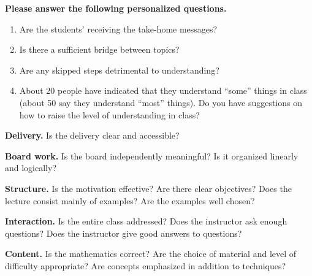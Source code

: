 \documentclass[10pt]{article}
\begin{document}
{\bf Please answer the following personalized questions.}
\begin{enumerate}
\item Are the students' receiving the take-home messages?
\vspace{10em}
\item Is there a sufficient bridge between topics?
\vspace{10em}
\item Are any skipped steps detrimental to understanding?
\vspace{10em}
\item About 20 people have indicated that they understand ``some'' things in class (about 50 say they understand ``most'' things). Do you have suggestions on how to raise the level of understanding in class?\vspace{10em}
\end{enumerate}

{\bf Delivery.} Is the delivery clear and accessible?

\vspace{12em}

{\bf Board work.} Is the board independently meaningful? Is it organized linearly and logically?

\vspace{10em}

{\bf Structure.} Is the motivation effective? Are there clear objectives? Does the lecture consist mainly of examples? Are the examples well chosen? 

\vspace{10em}

{\bf Interaction.} Is the entire class addressed? Does the instructor ask enough questions? Does the instructor give good answers to questions?

\vspace{10em} 


{\bf Content.} Is the mathematics correct? Are the choice of material and level of difficulty appropriate? Are concepts emphasized in addition to techniques?
\end{document}
